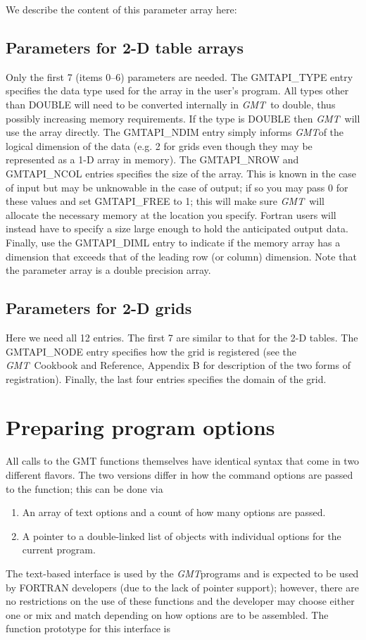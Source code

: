\documentclass{report}
\newcommand{\GMT}{\textit{GMT}}%
\newcommand{\GMT}{\htmladdnormallink{\texttt{[image: eps/GMT\_glyph10.eps]}}{http://gmt.soest.hawaii.edu}}%
\newcommand{\GMT}{\htmladdnormallink{\textbf{GMT}}{http://gmt.soest.hawaii.edu}}%
\begin{document}
We describe the content of this parameter array here:
\subsection{Parameters for 2-D table arrays}
Only the first 7 (items 0--6) parameters are needed.  The GMTAPI\_TYPE entry specifies the
data type used for the array in the user's program.  All types other than DOUBLE will need
to be converted internally in \GMT\ to double, thus possibly increasing memory requirements.
If the type is DOUBLE then \GMT\ will use the array directly.  The GMTAPI\_NDIM entry simply
informs \GMT of the logical dimension of the data (e.g. 2 for grids even though they may be
represented as a 1-D array in memory).  The GMTAPI\_NROW and GMTAPI\_NCOL entries specifies
the size of the array.  This is known in the case of input but may be unknowable in the case
of output; if so you may pass 0 for these values and set GMTAPI\_FREE to 1; this will make
sure \GMT\ will allocate the necessary memory at the location you specify.  Fortran users
will instead have to specify a size large enough to hold the anticipated output data.
Finally, use the GMTAPI\_DIML entry to indicate if the memory array has a dimension that
exceeds that of the leading row (or column) dimension.  Note that the parameter array is
a double precision array.

\subsection{Parameters for 2-D grids}
Here we need all 12 entries.  The first 7 are similar to that for the 2-D tables. The
GMTAPI\_NODE entry specifies how the grid is registered (see the \GMT\ Cookbook and Reference,
Appendix B for description of the two forms of registration).  Finally, the last four entries
specifies the domain of the grid.

\section{Preparing program options}
\index{GMT@\GMT!Preparing program options}

All calls to the GMT functions themselves have identical syntax that come in two different flavors.
The two versions differ in how the command options are passed to the function; this can be
done via
\begin{enumerate}
\item An array of text options and a count of how many options are passed.
\item A pointer to a double-linked list of objects with individual options
for the current program.
\end{enumerate}
The text-based interface is used by the \GMT programs and is expected to be used by
FORTRAN developers (due to the lack of pointer support); however, there are no restrictions on
the use of these functions and the developer may choose either one or mix and match depending
on how options are to be assembled.  The function prototype for this interface is
\end{document}
